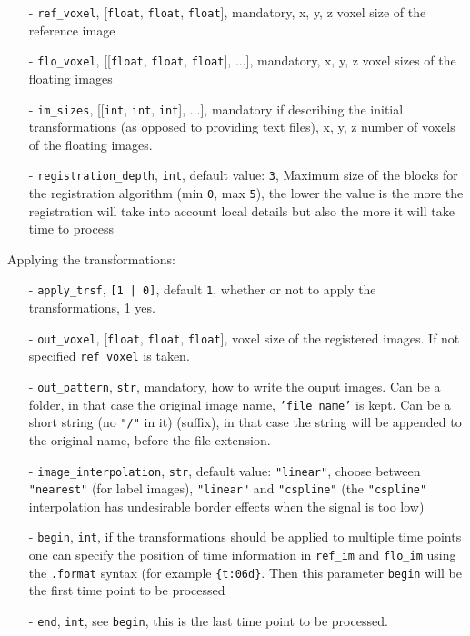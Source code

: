 \documentclass[10pt,a4paper]{book}
\newcommand{\option}[1]{{\texttt{'#1'}}}
\begin{document}
\begin{enumerate}
\item[-] \texttt{ref\_voxel}, [\texttt{float}, \texttt{float}, \texttt{float}], mandatory, x, y, z voxel size of the reference image
\item[-] \texttt{flo\_voxel}, [[\texttt{float}, \texttt{float}, \texttt{float}], ...], mandatory, x, y, z voxel sizes of the floating images
\item[-] \texttt{im\_sizes}, [[\texttt{int}, \texttt{int}, \texttt{int}], ...], mandatory if describing the initial transformations (as opposed to providing text files), x, y, z number of voxels of the floating images.
\item[-] \texttt{registration\_depth}, \texttt{int}, default value: \texttt{3}, Maximum size of the blocks for the registration algorithm (min \texttt{0}, max \texttt{5}), the lower the value is the more the registration will take into account local details but also the more it will take time to process
\end{enumerate}
Applying the transformations:
\begin{enumerate}
\item[-] \texttt{apply\_trsf}, \texttt{[1 | 0]}, default \texttt{1}, whether or not to apply the transformations, 1 yes.
\item[-] \texttt{out\_voxel}, [\texttt{float}, \texttt{float}, \texttt{float}], voxel size of the registered images. If not specified \texttt{ref\_voxel} is taken.
\item[-] \texttt{out\_pattern}, \texttt{str}, mandatory, how to write the ouput images. Can be a folder, in that case the original image name, \option{file\_name} is kept. Can be a short string (no \texttt{"/"} in it) (suffix), in that case the string will be appended to the original name, before the file extension.
\item[-] \texttt{image\_interpolation}, \texttt{str}, default value: \texttt{"linear"}, choose between \texttt{"nearest"} (for label images), \texttt{"linear"} and \texttt{"cspline"} (the \texttt{"cspline"} interpolation has undesirable border effects when the signal is too low)
\item[-] \texttt{begin}, \texttt{int}, if the transformations should be applied to multiple time points one can specify the position of time information in \texttt{ref\_im} and \texttt{flo\_im} using the \texttt{.format} syntax (for example \texttt{\{t:06d\}}. Then this parameter \texttt{begin} will be the first time point to be processed
\item[-] \texttt{end},  \texttt{int}, see \texttt{begin}, this is the last time point to be processed.
\end{enumerate}
\end{document}
